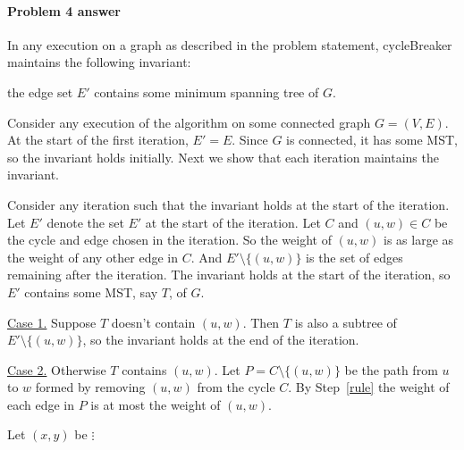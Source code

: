 \paragraph{Problem 4 answer}

\begin{lemma}\label{lemma: invariant}
  In any execution on a graph as described in the problem statement,
  \textsf{cycleBreaker} maintains the following invariant: \smallskip

  \centerline{the edge set $E'$ contains some minimum spanning tree of $G$.}
\end{lemma}

\begin{longFormProof}
  \step Consider any execution of the algorithm on some connected graph $G=(V,E)$.
  \step At the start of the first iteration, $E'=E$.
  \step Since $G$ is connected, it has some MST, so the invariant holds initially.
  \step Next we show that each iteration maintains the invariant.
  \begin{block}[iter]
    \step Consider any iteration such that the invariant holds at the start of the iteration.
    \step Let $E'$ denote the set $E'$ at the start of the iteration.
    \step Let $C$ and $(u,w)\in C$ be the cycle and edge chosen in the iteration.
    \step[rule] So the weight of $(u,w)$ is as large as the weight of any other edge in $C$.
    \step And $E'\setminus\{(u, w)\}$ is the set of edges remaining after the iteration. 
    \step The invariant holds at the start of the iteration, so $E'$ contains some MST, say $T$, of $G$.
    \begin{block}[C1]
      \step \underline{Case 1.}  Suppose $T$ doesn't contain $(u, w)$.
      \step Then $T$ is also a subtree of $E'\setminus\{(u, w)\}$, so the invariant holds at the end of the iteration.
    \end{block}
    \begin{block}[C2]
      \step \underline{Case 2.}  Otherwise $T$ contains $(u, w)$.
      \step Let $P= C\setminus\{(u,w)\}$ be the path from $u$ to $w$ formed by removing $(u,w)$ from the cycle $C$.
      \step By Step~\ref{rule} the weight of each edge in $P$ is at most the weight of $(u,w)$.

      \begin{blue}
        \step Let $(x, y)$ be \REPLACEME          %
        \step \REPLACEME
        \step $\vdots$
      \end{blue}


\end{block}
\end{block}
\end{longFormProof}
